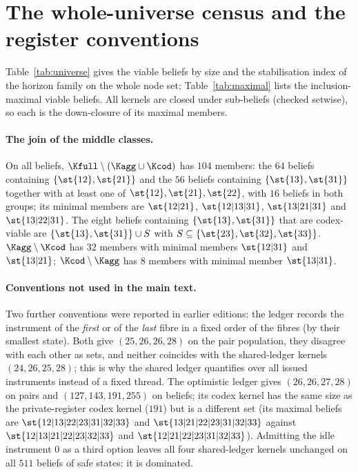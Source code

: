 \section{The whole-universe census and the register conventions}\label{si:universe}

Table~\ref{tab:universe} gives the viable beliefs by size and the stabilisation index of the horizon family on the whole node set; Table~\ref{tab:maximal} lists the inclusion-maximal viable beliefs. All kernels are closed under sub-beliefs (checked setwise), so each is the down-closure of its maximal members.




\paragraph{The join of the middle classes.}
On all beliefs, $\Kfull\setminus(\Kagg\cup\Kcod)$ has $104$ members: the $64$ beliefs containing $\{\st{12},\st{21}\}$ and the $56$ beliefs containing $\{\st{13},\st{31}\}$ together with at least one of $\st{12},\st{21},\st{22}$, with $16$ beliefs in both groups; its minimal members are $\st{12|21}$, $\st{12|13|31}$, $\st{13|21|31}$ and $\st{13|22|31}$. The eight beliefs containing $\{\st{13},\st{31}\}$ that are codex-viable are $\{\st{13},\st{31}\}\cup S$ with $S\subseteq\{\st{23},\st{32},\st{33}\}$. $\Kagg\setminus\Kcod$ has $32$ members with minimal members $\st{12|31}$ and $\st{13|21}$; $\Kcod\setminus\Kagg$ has $8$ members with minimal member $\st{13|31}$.

\paragraph{Conventions not used in the main text.}
Two further conventions were reported in earlier editions: the ledger records the instrument of the \emph{first} or of the \emph{last} fibre in a fixed order of the fibres (by their smallest state). Both give $(25,26,26,28)$ on the pair population, they disagree with each other as sets, and neither coincides with the shared-ledger kernels $(24,26,25,28)$; this is why the shared ledger quantifies over all issued instruments instead of a fixed thread. The optimistic ledger gives $(26,26,27,28)$ on pairs and $(127,143,191,255)$ on beliefs; its codex kernel has the same size as the private-register codex kernel ($191$) but is a different set (its maximal beliefs are $\st{12|13|22|23|31|32|33}$ and $\st{13|21|22|23|31|32|33}$ against $\st{12|13|21|22|23|32|33}$ and $\st{12|21|22|23|31|32|33}$). Admitting the idle instrument $0$ as a third option leaves all four shared-ledger kernels unchanged on all $511$ beliefs of safe states: it is dominated.

